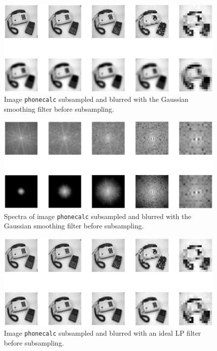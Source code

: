 \documentclass[12pt]{article}
\begin{document}
\begin{figure}[htbp]
 \centering
 \includegraphics[width=\textwidth]{q19a}
 \caption{Image \texttt{phonecalc} subsampled and blurred with the Gaussian smoothing filter before subsampling.}
 \label{fig:q19a}
\end{figure}
\begin{figure}[htbp]
 \centering
 \includegraphics[width=\textwidth]{q19b}
 \caption{Spectra of image \texttt{phonecalc} subsampled and blurred with the Gaussian smoothing filter before subsampling.}
 \label{fig:q19b}
\end{figure}
\begin{figure}[htbp]
 \centering
 \includegraphics[width=\textwidth]{q19c}
 \caption{Image \texttt{phonecalc} subsampled and blurred with an ideal LP filter before subsampling.}
 \label{fig:q19c}
\end{figure}
\end{document}
